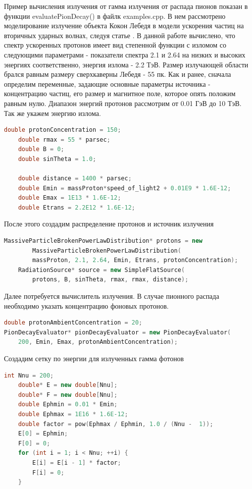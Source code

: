 Пример вычисления излучения от гамма излучения от распада пионов показан в функции evaluatePionDecay() в файлк examples.cpp. В нем рассмотрено моделирование излучение объекта Кокон Лебедя в модели ускорения частиц на вторичных ударных волнах, следуя статье \cite{BykovKalyashova2022}. В данной работе вычислено, что спектр ускоренных протонов имеет вид степенной функции с изломом со следующими параметрами - показатели спектра 2.1 и 2.64 на низких и высоких энергиях соответственно, энергия излома - 2.2 ТэВ. Размер излучающей области брался равным размеру сверхкаверны Лебедя - 55 пк. Как и ранее, сначала определим переменные, задающие основные параметры источника - концентрацию частиц, его размер и магнитное поле, которое опять положим равным нулю. Диапазон энергий протонов рассмотрим от 0.01 ГэВ до 10 ТэВ. Так же укажем энергию излома.
\begin{lstlisting}[language=c++]
	double protonConcentration = 150;
	double rmax = 55 * parsec;
	double B = 0;
	double sinTheta = 1.0;

	double distance = 1400 * parsec;
	double Emin = massProton*speed_of_light2 + 0.01E9 * 1.6E-12;
	double Emax = 1E13 * 1.6E-12;
	double Etrans = 2.2E12 * 1.6E-12;
\end{lstlisting}
После этого создадим распределение протонов и источник излучения
\begin{lstlisting}[language=c++]
	MassiveParticleBrokenPowerLawDistribution* protons = new 
		MassiveParticleBrokenPowerLawDistribution(
		massProton, 2.1, 2.64, Emin, Etrans, protonConcentration);
	RadiationSource* source = new SimpleFlatSource(
		protons, B, sinTheta, rmax, rmax, distance);
\end{lstlisting}
Далее потребуется вычислитель излучения. В случае пионного распада необходимо указать концентрацию фоновых протонов.
\begin{lstlisting}[language=c++]
double protonAmbientConcentration = 20;
PionDecayEvaluator* pionDecayEvaluator = new PionDecayEvaluator(
	200, Emin, Emax, protonAmbientConcentration);
\end{lstlisting}
Создадим сетку по энергии для излученных гамма фотонов
\begin{lstlisting}[language=c++]
	int Nnu = 200;
	double* E = new double[Nnu];
	double* F = new double[Nnu];
	double Ephmin = 0.01 * Emin;
	double Ephmax = 1E16 * 1.6E-12;
	double factor = pow(Ephmax / Ephmin, 1.0 / (Nnu -  1));
	E[0] = Ephmin;
	F[0] = 0;
	for (int i = 1; i < Nnu; ++i) {
		E[i] = E[i - 1] * factor;
		F[i] = 0;
	}
\end{lstlisting}
